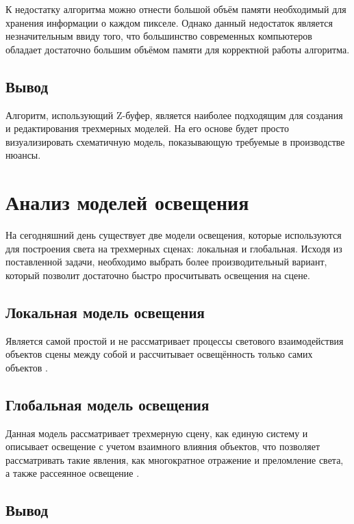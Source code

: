 К недостатку алгоритма можно отнести большой объём памяти необходимый для хранения информации о каждом пикселе. Однако данный недостаток является незначительным ввиду того, что большинство современных компьютеров обладает достаточно большим объёмом памяти для корректной работы алгоритма.

\subsection*{Вывод}

Алгоритм, использующий Z-буфер, является наиболее подходящим для создания и редактирования трехмерных моделей. На его основе будет просто визуализировать схематичную модель, показывающую требуемые в производстве нюансы.


\section{Анализ моделей освещения}

На сегодняшний день существует две модели освещения, которые используются для построения света на трехмерных сценах: локальная и глобальная. Исходя из поставленной задачи, необходимо выбрать более производительный вариант, который позволит достаточно быстро просчитывать освещения на сцене.

\subsection{Локальная модель освещения}

Является самой простой и не рассматривает процессы светового взаимодействия объектов сцены между собой и рассчитывает освещённость только самих объектов \cite{lamber_fong}.

\subsection{Глобальная модель освещения}

Данная модель рассматривает трехмерную сцену, как единую систему и описывает освещение с учетом взаимного влияния объектов, что позволяет рассматривать такие явления, как многократное отражение и преломление света, а также рассеянное освещение \cite{lamber_fong}.

\subsection*{Вывод}

